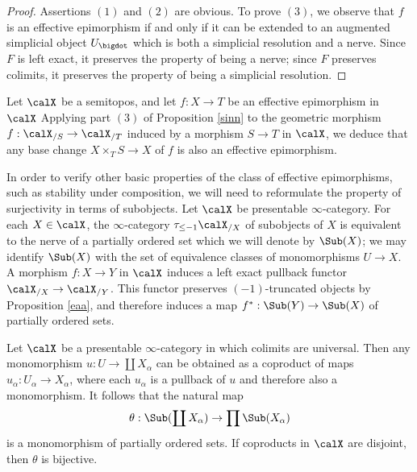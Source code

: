 \begin{proof}
Assertions $(1)$ and $(2)$ are obvious. To prove $(3)$, we observe that $f$ is an effective epimorphism if and only if it can be extended to an augmented simplicial object $U_{\bigdot}$ which is both a simplicial resolution and a \Cech nerve. Since $F$ is left exact, it preserves the property of being a \Cech nerve; since $F$ preserves colimits, it preserves the property of being a simplicial resolution.
\end{proof}

\begin{remark}
Let $\calX$ be a semitopos, and let $f: X \rightarrow T$ be an effective epimorphism in $\calX$
Applying part $(3)$ of Proposition \ref{sinn} to the geometric morphism $f: \calX_{/S} \rightarrow \calX_{/T}$ induced by a morphism $S \rightarrow T$ in $\calX$, we deduce that any base change
$X \times_{T} S \rightarrow X$ of $f$ is also an effective epimorphism.
\end{remark}

In order to verify other basic properties of the class of effective epimorphisms, such as stability under composition, we will need to reformulate the property of surjectivity in terms of subobjects.
Let $\calX$ be presentable $\infty$-category. For each $X \in \calX$, the $\infty$-category
$\tau_{\leq -1} \calX_{/X}$ of subobjects of $X$ is equivalent to the nerve of a partially
ordered set which we will denote by $\Sub(X)$; we may identify $\Sub(X)$ with the 
set of equivalence classes of monomorphisms $U \rightarrow X$.
A morphism $f: X \rightarrow Y$ in $\calX$ induces a left exact pullback functor $\calX_{/X} \rightarrow \calX_{/Y}$. This functor preserves $(-1)$-truncated objects by Proposition \ref{eaa}, and therefore induces a map $f^{\ast}: \Sub(Y) \rightarrow \Sub(X)$ of partially ordered sets. 

\begin{remark}\label{summep}
Let $\calX$ be a presentable $\infty$-category in which colimits are universal. Then any monomorphism $u: U \rightarrow \coprod X_{\alpha}$ can be obtained as a coproduct
of maps $u_{\alpha}: U_{\alpha} \rightarrow X_{\alpha}$, where each $u_{\alpha}$ is a pullback of $u$ and therefore also a monomorphism. It follows that the natural map
$$ \theta: \Sub( \coprod X_{\alpha} ) \rightarrow \prod \Sub(X_{\alpha})$$
is a monomorphism of partially ordered sets. If coproducts in $\calX$ are disjoint, then
$\theta$ is bijective.
\end{remark}

